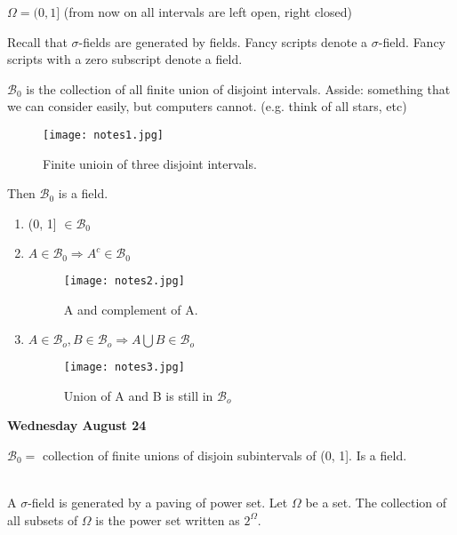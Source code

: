 \documentclass[11pt,fleqn]{book} %
\begin{document}
\begin{example}
	$\Omega = (0, 1]$ (from now on all intervals are left open, right closed)\\

	\begin{remark}
		Recall that $\sigma$-fields are generated by fields. Fancy scripts denote a $\sigma$-field. Fancy scripts with a zero subscript denote a field.
	\end{remark}

	$\mathcal{B}_0$ is the collection of all finite union of disjoint intervals. Asside: something that we can consider easily, but computers cannot. (e.g. think of all stars, etc)

	\begin{figure}[h]
	\centering\texttt{[image: notes1.jpg]}
	\caption{Finite unioin of three disjoint intervals.}
	\end{figure}

	Then $\mathcal{B}_0$ is a field. 

	\begin{enumerate}[label = (\roman*)]
		\item (0, 1] $\in \mathcal{B}_0$
		\item $A \in \mathcal{B}_0 \Rightarrow A^c \in \mathcal{B}_0$ 
		\begin{figure}[h]
		\centering\texttt{[image: notes2.jpg]}
		\caption{A and complement of A.}
		\end{figure}

		\item $A \in \mathcal{B}_o, B \in \mathcal{B}_o \Rightarrow A \bigcup B \in \mathcal{B}_o$ 

		\begin{figure}[h]
		\centering\texttt{[image: notes3.jpg]}
		\caption{Union of A and B is still in $\mathcal{B}_o$}
		\end{figure}

	\end{enumerate}


\end{example}


\textbf{Wednesday August 24}

$\mathcal{B}_0 = $ collection of finite unions of disjoin subintervals of (0, 1]. Is a field. \\
\\

\begin{definition}
	A $\sigma$-field is generated by a paving of power set. Let $\Omega$ be a set. The collection of all subsets of $\Omega$ is the power set written as $2^\Omega$.
\end{definition}
\end{document}
